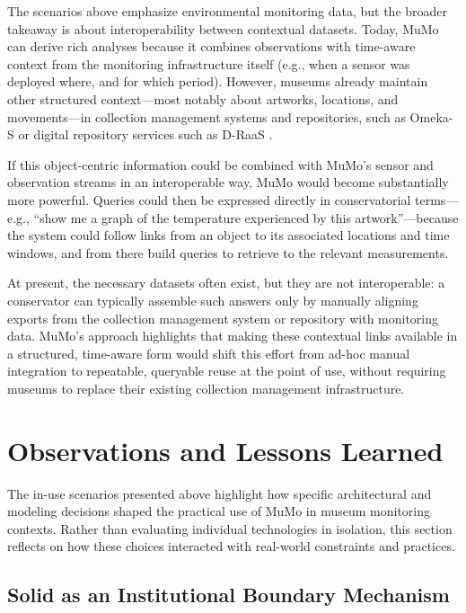 The scenarios above emphasize environmental monitoring data, but the
broader takeaway is about interoperability between contextual datasets.
Today, MuMo can derive rich analyses because it combines observations
with time-aware context from the monitoring infrastructure itself (e.g.,
when a sensor was deployed where, and for which period). However,
museums already maintain other structured context---most notably about
artworks, locations, and movements---in collection management systems
and repositories, such as Omeka-S or digital repository services such as
D-RaaS \cite{draas2023}.

If this object-centric information could be combined with MuMo's sensor
and observation streams in an interoperable way, MuMo would become
substantially more powerful. Queries could then be expressed directly in
conservatorial terms---e.g., ``show me a graph of the temperature
experienced by this artwork''---because the system could follow links
from an object to its associated locations and time windows, and from
there build queries to retrieve to the relevant measurements.

At present, the necessary datasets often exist, but they are not
interoperable: a conservator can typically assemble such answers only by
manually aligning exports from the collection management system or
repository with monitoring data. MuMo's approach highlights that making
these contextual links available in a structured, time-aware form would
shift this effort from ad-hoc manual integration to repeatable,
queryable reuse at the point of use, without requiring museums to
replace their existing collection management infrastructure.

\section{Observations and Lessons Learned}\label{sec:lessons}

The in-use scenarios presented above highlight how specific
architectural and modeling decisions shaped the practical use of MuMo in
museum monitoring contexts. Rather than evaluating individual
technologies in isolation, this section reflects on how these choices
interacted with real-world constraints and practices.

\subsection{Solid as an Institutional Boundary
Mechanism}\label{solid-as-an-institutional-boundary-mechanism}


